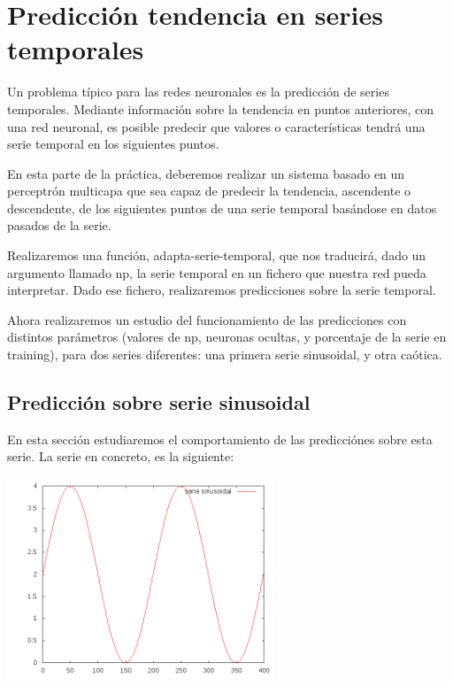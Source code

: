 \documentclass[12pt]{article}
\begin{document}
\newpage

\section{Predicción tendencia en series temporales}

Un problema típico para las redes neuronales es la predicción de series temporales. Mediante información sobre la tendencia en puntos anteriores, con una red neuronal, es posible predecir que valores o características tendrá una serie temporal en los siguientes puntos.

En esta parte de la práctica, deberemos realizar un sistema basado en un perceptrón multicapa que sea capaz de predecir la tendencia, ascendente o descendente, de los siguientes puntos de una serie temporal basándose en datos pasados de la serie.

Realizaremos una función, adapta-serie-temporal, que nos traducirá, dado un argumento llamado np, la serie temporal en un fichero que nuestra red pueda interpretar. Dado ese fichero, realizaremos predicciones sobre la serie temporal.

Ahora realizaremos un estudio del funcionamiento de las predicciones con distintos parámetros (valores de np, neuronas ocultas, y porcentaje de la serie en training), para dos series diferentes: una primera serie sinusoidal, y otra caótica.

\subsection{Predicción sobre serie sinusoidal}

En esta sección estudiaremos el comportamiento de las predicciónes sobre esta serie. La serie en concreto, es la siguiente:
\begin{center}
	\includegraphics[width=8cm]{serie_sinusoidal}
\end{center}
\end{document}

